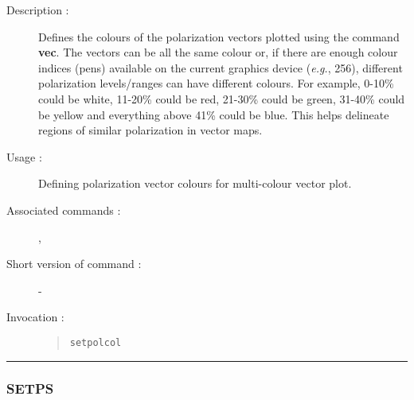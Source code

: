 \begin{description}

\item[Description :] Defines the colours of the polarization vectors
plotted using the command {\bf vec}.  The vectors can be all the same
colour or, if there are enough colour indices (pens) available on the
current graphics device (\emph{e.g.}, 256), different polarization
levels/ranges can have different colours. For example, 0-10\% could be
white, 11-20\% could be red, 21-30\% could be green, 31-40\% could be
yellow and everything above 41\% could be blue.  This helps delineate
regions of similar polarization in vector maps.

\item[Usage :] Defining polarization vector colours for multi-colour
vector plot.

\item[Associated commands :] {\tt {}},
{\tt {}}

\item[Short version of command :] -
\item[Invocation :]

\begin{quote}{\tt  setpolcol }\end{quote}

\end{description}

\hrule
\subsubsection*{\label{SETPS}SETPS}

